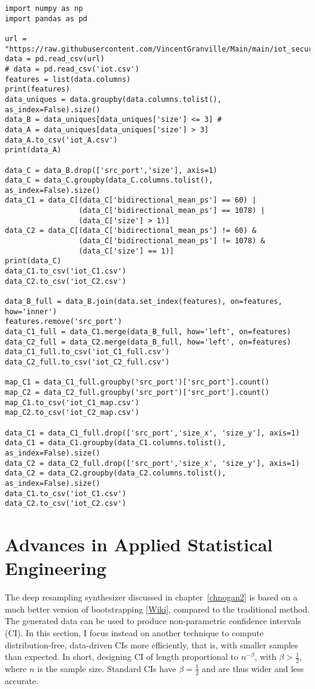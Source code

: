 \documentclass[oneside,10pt]{book}
\begin{document}
\begin{lstlisting}
import numpy as np
import pandas as pd

url = "https://raw.githubusercontent.com/VincentGranville/Main/main/iot_security.csv"
data = pd.read_csv(url) 
# data = pd.read_csv('iot.csv')
features = list(data.columns)
print(features)
data_uniques = data.groupby(data.columns.tolist(), as_index=False).size()
data_B = data_uniques[data_uniques['size'] <= 3] #
data_A = data_uniques[data_uniques['size'] > 3]
data_A.to_csv('iot_A.csv')
print(data_A)

data_C = data_B.drop(['src_port','size'], axis=1) 
data_C = data_C.groupby(data_C.columns.tolist(), as_index=False).size()
data_C1 = data_C[(data_C['bidirectional_mean_ps'] == 60) | 
                 (data_C['bidirectional_mean_ps'] == 1078) |
                 (data_C['size'] > 1)]
data_C2 = data_C[(data_C['bidirectional_mean_ps'] != 60) & 
                 (data_C['bidirectional_mean_ps'] != 1078) &
                 (data_C['size'] == 1)]
print(data_C)
data_C1.to_csv('iot_C1.csv')
data_C2.to_csv('iot_C2.csv')

data_B_full = data_B.join(data.set_index(features), on=features, how='inner') 
features.remove('src_port')
data_C1_full = data_C1.merge(data_B_full, how='left', on=features) 
data_C2_full = data_C2.merge(data_B_full, how='left', on=features) 
data_C1_full.to_csv('iot_C1_full.csv')
data_C2_full.to_csv('iot_C2_full.csv')

map_C1 = data_C1_full.groupby('src_port')['src_port'].count()
map_C2 = data_C2_full.groupby('src_port')['src_port'].count()
map_C1.to_csv('iot_C1_map.csv')
map_C2.to_csv('iot_C2_map.csv')

data_C1 = data_C1_full.drop(['src_port','size_x', 'size_y'], axis=1)
data_C1 = data_C1.groupby(data_C1.columns.tolist(), as_index=False).size()
data_C2 = data_C2_full.drop(['src_port','size_x', 'size_y'], axis=1)
data_C2 = data_C2.groupby(data_C2.columns.tolist(), as_index=False).size()
data_C1.to_csv('iot_C1.csv')
data_C2.to_csv('iot_C2.csv')
\end{lstlisting}



\section{Advances in Applied Statistical Engineering}

The deep resampling synthesizer discussed in chapter~\ref{chnogan2} is based on a much better version of 
 \textcolor{index}{bootstrapping} [\href{https://en.wikipedia.org/wiki/Bootstrapping_(statistics)}{Wiki}], compared to the traditional method. The generated data
 can be used to produce non-parametric \textcolor{index}{confidence intervals} (CI). In this section, I focus instead on another
 technique to compute distribution-free, data-driven CIs more efficiently, that is, with smaller samples than expected.  In short, designing CI
 of length proportional to $n^{-\beta}$, with $\beta>\frac{1}{2}$, where $n$ is the sample size. Standard CIs have $\beta = \frac{1}{2}$ and are thus wider and less accurate.
\end{document}
